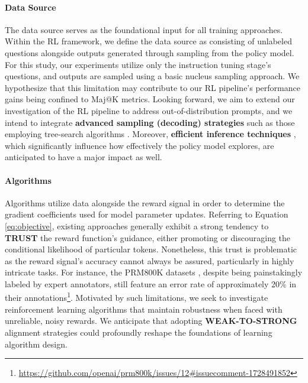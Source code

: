 \begin{itemize}[topsep=0pt]
\begin{itemize}[topsep=0pt]
\paragraph{Data Source} The data source serves as the foundational input for all training approaches. Within the RL framework, we define the data source as consisting of unlabeled questions alongside outputs generated through sampling from the policy model. For this study, our experiments utilize only the instruction tuning stage's questions, and outputs are sampled using a basic nucleus sampling approach. We hypothesize that this limitation may contribute to our RL pipeline's performance gains being confined to Maj@K metrics. Looking forward, we aim to extend our investigation of the RL pipeline to address out-of-distribution prompts, and we intend to integrate \textbf{advanced sampling (decoding) strategies} such as those employing tree-search algorithms \citep{yao2023tree}. Moreover, \textbf{efficient inference techniques} \citep{xia-etal-2023-speculative,leviathan2023fast,kwon2023efficient,xia2024unlocking}, which significantly influence how effectively the policy model explores, are anticipated to have a major impact as well.

\paragraph{Algorithms} Algorithms utilize data alongside the reward signal in order to determine the gradient coefficients used for model parameter updates. Referring to Equation \ref{eq:objective}, existing approaches generally exhibit a strong tendency to \textbf{TRUST} the reward function’s guidance, either promoting or discouraging the conditional likelihood of particular tokens. Nonetheless, this trust is problematic as the reward signal's accuracy cannot always be assured, particularly in highly intricate tasks. For instance, the PRM800K datasets \citep{lightman2023let}, despite being painstakingly labeled by expert annotators, still feature an error rate of approximately 20\% in their annotations\footnote{\url{https://github.com/openai/prm800k/issues/12\#issuecomment-1728491852}}. Motivated by such limitations, we seek to investigate reinforcement learning algorithms that maintain robustness when faced with unreliable, noisy rewards. We anticipate that adopting \textbf{WEAK-TO-STRONG} \citep{burns2023weak} alignment strategies could profoundly reshape the foundations of learning algorithm design.


\end{itemize}
\end{itemize}
